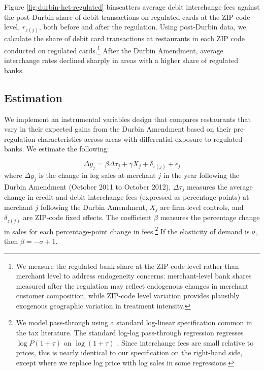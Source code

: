 \documentclass[11pt,english]{article}
\theoremstyle{remark}
\begin{document}
Figure \ref{fig:durbin-het-regulated} binscatters average debit interchange fees against the post-Durbin share of debit transactions on regulated cards at the ZIP code level, $r_{z(j)}$, both before and after the regulation.
Using post-Durbin data, we calculate the share of debit card transactions at restaurants in each ZIP code conducted on regulated cards.\footnote{ We measure the regulated bank share at the ZIP-code level rather than merchant level to address endogeneity concerns: merchant-level bank shares measured after the regulation may reflect endogenous changes in merchant customer composition, while ZIP-code level variation provides plausibly exogenous geographic variation in treatment intensity. } After the Durbin Amendment, average interchange rates declined sharply in areas with a higher share of regulated banks.

\subsection{Estimation}

We implement an instrumental variables design that compares restaurants that vary in their expected gains from the Durbin Amendment based on their pre-regulation characteristics across areas with differential exposure to regulated banks.
We estimate the following:

\begin{equation}
\Delta y_{j}=\beta\Delta\tau_{j} + \gamma X_j + \delta_{z(j)} + \epsilon_{j}
\end{equation}
where $\Delta y_{j}$ is the change in log sales at merchant $j$ in the year following the Durbin Amendment (October 2011 to October 2012), $\Delta\tau_{j}$ measures the average change in credit and debit interchange fees (expressed as percentage points) at merchant $j$ following the Durbin Amendment, $X_j$ are firm-level controls, and $\delta_{z(j)}$ are ZIP-code fixed effects.
The coefficient $\beta$ measures the percentage change in sales for each percentage-point change in fees.\footnote{ We model pass-through using a standard log-linear specification common in the tax literature.
The standard log-log pass-through regression regresses $\log P\left(1+\tau\right)$ on $\log\left(1+\tau\right)$ \citep{Butters.etal2022}.
Since interchange fees are small relative to prices, this is nearly identical to our specification on the right-hand side, except where we replace log price with log sales in some regressions.} If the elasticity of demand is $\sigma$, then $\beta = -\sigma + 1$.
\end{document}
